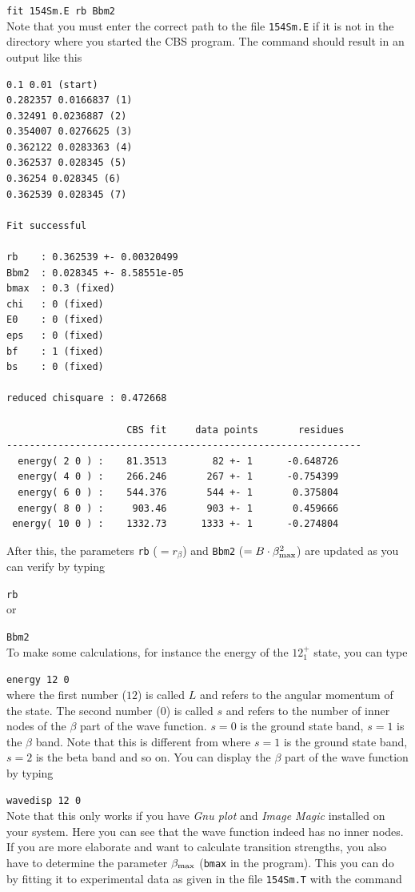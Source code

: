 \documentclass[10pt,a4paper]{article}
\begin{document}
\verb!fit 154Sm.E rb Bbm2! \\
Note that you must enter the correct path to the file \verb!154Sm.E! if it is not in the directory where you started the CBS program. The command should result in an output like this
\begin{verbatim}
0.1 0.01 (start)       
0.282357 0.0166837 (1) 
0.32491 0.0236887 (2)  
0.354007 0.0276625 (3) 
0.362122 0.0283363 (4) 
0.362537 0.028345 (5)  
0.36254 0.028345 (6)   
0.362539 0.028345 (7)  

Fit successful

rb    : 0.362539 +- 0.00320499
Bbm2  : 0.028345 +- 8.58551e-05
bmax  : 0.3 (fixed)
chi   : 0 (fixed)
E0    : 0 (fixed)
eps   : 0 (fixed)
bf    : 1 (fixed)
bs    : 0 (fixed)

reduced chisquare : 0.472668

                     CBS fit     data points       residues
--------------------------------------------------------------
  energy( 2 0 ) :    81.3513        82 +- 1      -0.648726
  energy( 4 0 ) :    266.246       267 +- 1      -0.754399
  energy( 6 0 ) :    544.376       544 +- 1       0.375804
  energy( 8 0 ) :     903.46       903 +- 1       0.459666
 energy( 10 0 ) :    1332.73      1333 +- 1      -0.274804
\end{verbatim}
After this, the parameters \verb!rb! ($=r_{\beta}$) and \verb!Bbm2! ($=B\cdot\beta_{\rm max}^2$) are updated as you can verify by typing 

\verb!rb! \\
or 

\verb!Bbm2! \\

To make some calculations, for instance the energy of the $12^{+}_1$ state, you can type

\verb!energy 12 0! \\
where the first number ($12$) is called $L$ and refers to the angular momentum of the state. The second number ($0$) is called $s$ and refers to the number of inner nodes of the $\beta$ part of the wave function. $s=0$ is the ground state band, $s=1$ is the $\beta$ band. Note that this is different from \cite{Pietralla} where $s=1$ is the ground state band, $s=2$ is the beta band and so on. You can display the $\beta$ part of the wave function by typing

\verb!wavedisp 12 0! \\
Note that this only works if you have \textit{Gnu plot} and \textit{Image Magic} installed on your system. Here you can see that the wave function indeed has no inner nodes. If you are more elaborate and want to calculate transition strengths, you also have to determine the parameter $\beta_{\rm max}$ (\verb!bmax! in the program). This you can do by fitting it to experimental data as given in the file \verb!154Sm.T! with the command
\end{document}
